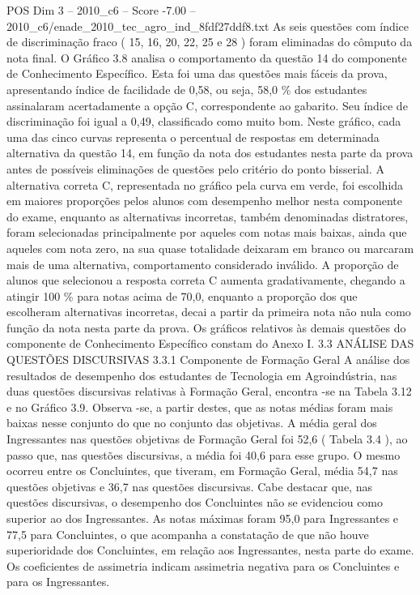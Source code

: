 \begin{textsample}{POS Dim 3 – 2010\_c6 – Score -7.00 – 2010\_c6/enade\_2010\_tec\_agro\_ind\_8fdf27ddf8.txt}
As seis questões com índice de discriminação fraco ( 15, 16, 20, 22, 25 e 28 ) foram eliminadas do cômputo da nota final.
O Gráfico 3.8 analisa o comportamento da questão 14 do componente de Conhecimento Específico.
Esta foi uma das questões mais fáceis da prova, apresentando índice de facilidade de 0,58, ou seja, 58,0 \% dos estudantes assinalaram acertadamente a opção C, correspondente ao gabarito.
Seu índice de discriminação foi igual a 0,49, classificado como muito bom.
Neste gráfico, cada uma das cinco curvas representa o percentual de respostas em determinada alternativa da questão 14, em função da nota dos estudantes nesta parte da prova antes de possíveis eliminações de questões pelo critério do ponto bisserial.
A alternativa correta C, representada no gráfico pela curva em verde, foi escolhida em maiores proporções pelos alunos com desempenho melhor nesta componente do exame, enquanto as alternativas incorretas, também denominadas distratores, foram selecionadas principalmente por aqueles com notas mais baixas, ainda que aqueles com nota zero, na sua quase totalidade deixaram em branco ou marcaram mais de uma alternativa, comportamento considerado inválido.
A proporção de alunos que selecionou a resposta correta C aumenta gradativamente, chegando a atingir 100 \% para notas acima de 70,0, enquanto a proporção dos que escolheram alternativas incorretas, decai a partir da primeira nota não nula como função da nota nesta parte da prova.
Os gráficos relativos às demais questões do componente de Conhecimento Específico constam do Anexo I. 3.3 ANÁLISE DAS QUESTÕES DISCURSIVAS 3.3.1 Componente de Formação Geral A análise dos resultados de desempenho dos estudantes de Tecnologia em Agroindústria, nas duas questões discursivas relativas à Formação Geral, encontra -se na Tabela 3.12 e no Gráfico 3.9.
Observa -se, a partir destes, que as notas médias foram mais baixas nesse conjunto do que no conjunto das objetivas.
A média geral dos Ingressantes nas questões objetivas de Formação Geral foi 52,6 ( Tabela 3.4 ), ao passo que, nas questões discursivas, a média foi 40,6 para esse grupo.
O mesmo ocorreu entre os Concluintes, que tiveram, em Formação Geral, média 54,7 nas questões objetivas e 36,7 nas questões discursivas.
Cabe destacar que, nas questões discursivas, o desempenho dos Concluintes não se evidenciou como superior ao dos Ingressantes.
As notas máximas foram 95,0 para Ingressantes e 77,5 para Concluintes, o que acompanha a constatação de que não houve superioridade dos Concluintes, em relação aos Ingressantes, nesta parte do exame.
Os coeficientes de assimetria indicam assimetria negativa para os Concluintes e para os Ingressantes.

\end{textsample}
